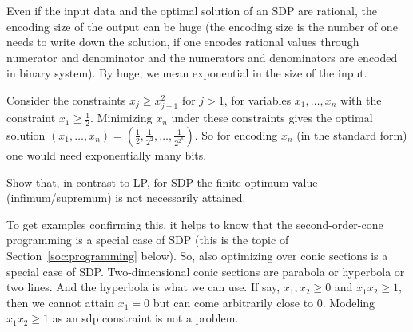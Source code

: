 \begin{exercise}
	Even if the input data and the optimal solution of an SDP are rational, the encoding size of the output can be huge (the encoding size is the number of one needs to write down the solution, if one encodes rational values through numerator and denominator and the numerators and denominators are encoded in binary system). By huge, we mean exponential in the size of the input. 
\end{exercise}
\begin{solution}
	Consider the constraints $x_j \ge x_{j-1}^2$ for $j > 1$, for variables $x_1,\ldots,x_n$ with the constraint $x_1 \ge \frac{1}{2}$. Minimizing $x_n$ under these constraints gives the optimal solution $(x_1,\ldots,x_n) = (\frac{1}{2}, \frac{1}{2^2},\ldots,\frac{1}{2^{2^n}})$. So for encoding $x_n$ (in the standard form) one would need exponentially many bits. 
\end{solution}

\begin{exercise}
	Show that, in contrast to LP, for SDP the finite optimum value (infimum/supremum) is not necessarily attained. 
\end{exercise}
\begin{solution}
	To get examples confirming this, it helps to know that the second-order-cone programming is a special case of SDP (this is the topic of Section~\ref{soc:programming} below). So, also optimizing over conic sections is a special case of SDP. Two-dimensional conic sections are parabola or hyperbola or two lines. And the hyperbola is what we can use. If say, $x_1, x_2 \ge 0$ and $x_1 x_2 \ge 1$, then we cannot attain $x_1=0$ but can come arbitrarily close to $0$. Modeling $x_1 x_2 \ge 1$ as an sdp constraint is not a problem. 
\end{solution}


